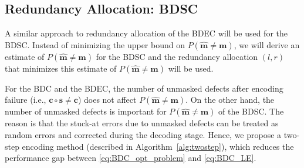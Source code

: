 \documentclass[10pt,twocolumn,twoside,submit]{JCNtran}
\begin{document}
\subsection{Redundancy Allocation: BDSC} \label{sec:BDSC_ra}


	A similar approach to redundancy allocation of the BDEC will be used for the BDSC. Instead of minimizing the upper bound on $P\left( \widehat{\mathbf{m}} \ne \mathbf{m} \right)$, we will derive an estimate of $P\left( \widehat{\mathbf{m}} \ne \mathbf{m} \right)$ for the BDSC and the redundancy allocation $(l, r)$ that minimizes this estimate of $P\left( \widehat{\mathbf{m}} \ne \mathbf{m} \right)$ will be used. 
	
	
	
	For the BDC and the BDEC, the number of unmasked defects after encoding failure (i.e., $\mathbf{c} \circ \mathbf{s} \ne \mathbf{c}$) does not affect $P\left( \widehat{\mathbf{m}} \ne \mathbf{m} \right)$. On the other hand, the number of unmasked defects is important for $P\left( \widehat{\mathbf{m}} \ne \mathbf{m} \right)$ of the BDSC. The reason is that the stuck-at errors due to unmasked defects can be treated as random errors and corrected during the decoding stage. Hence, we propose a two-step encoding method (described in Algorithm~\ref{alg:twostep}), which reduces the performance gap between \eqref{eq:BDC_opt_problem} and \eqref{eq:BDC_LE}. 
	
\end{document}
